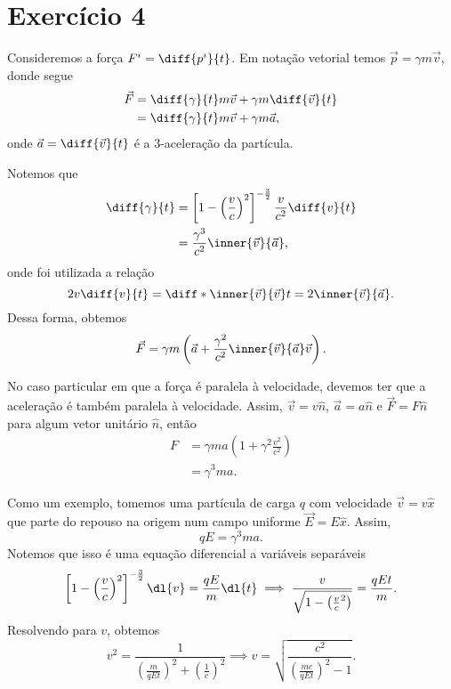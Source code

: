 \section*{Exercício 4}

Consideremos a força \(F^i = \diff{p^i}{t}\). Em notação vetorial temos \(\vec{p} = \gamma m \vec{v}\), donde segue
\begin{align*}
    \vec{F} &= \diff{\gamma}{t} m \vec{v} + \gamma m \diff{\vec{v}}{t}\\
            &= \diff{\gamma}{t}  m \vec{v} + \gamma m\vec{a},
\end{align*}
onde \(\vec{a} = \diff{\vec{v}}{t}\) é a 3-aceleração da partícula.

Notemos que
\begin{align*}
    \diff{\gamma}{t} &= \left[1 - \left(\frac{v}{c}\right)^2\right]^{-\frac32} \frac{v}{c^2}\diff{v}{t}\\
                     &= \frac{\gamma^3}{c^2} \inner{\vec{v}}{\vec{a}},
\end{align*}
onde foi utilizada a relação
\begin{equation*}
    2v\diff{v}{t} = \diff*{\inner{\vec{v}}{\vec{v}}}{t} = 2\inner{\vec{v}}{\vec{a}}.
\end{equation*}
Dessa forma, obtemos
\begin{equation*}
    \vec{F} = \gamma m \left(\vec{a} + \frac{\gamma^2}{c^2}\inner{\vec{v}}{\vec{a}}\vec{v}\right).
\end{equation*}

No caso particular em que a força é paralela à velocidade, devemos ter que a aceleração é também paralela à velocidade. Assim, \(\vec{v} = v \hat{n}\), \(\vec{a} = a\hat{n}\) e \(\vec{F} = F\hat{n}\) para algum vetor unitário \(\hat{n}\), então
\begin{align*}
    F &= \gamma ma \left(1 + \gamma^2\frac{v^2}{c^2}\right)\\
      &= \gamma^3 ma.
\end{align*}

Como um exemplo, tomemos uma partícula de carga \(q\) com velocidade \(\vec{v} = v\hat{x}\) que parte do repouso na origem num campo uniforme \(\vec{E} = E\hat{x}\). Assim,
\begin{equation*}
    qE = \gamma^3 ma.
\end{equation*}
Notemos que isso é uma equação diferencial a variáveis separáveis
\begin{equation*}
    \left[1 - \left(\frac{v}{c}\right)^2\right]^{-\frac32}\dl{v} = \frac{qE}{m} \dl{t} \implies \frac{v}{\sqrt{1 - \left(\frac{v}{c}^2\right)}} = \frac{qEt}{m}.
\end{equation*}
Resolvendo para \(v\), obtemos
\begin{equation*}
    v^2 = \frac{1}{\left(\frac{m}{qEt}\right)^2 + \left(\frac{1}{c}\right)^2} \implies v = \sqrt{\frac{c^2}{\left(\frac{mc}{qEt}\right)^2 - 1}}.
\end{equation*}

